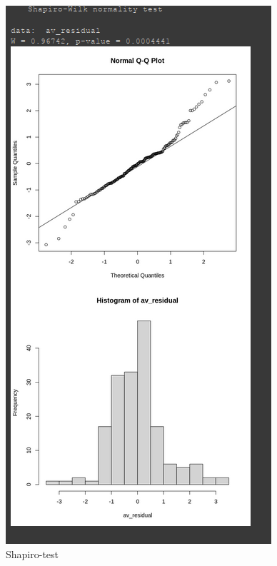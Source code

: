 \begin{itemize}
\begin{itemize}
    \begin{figure}[H]
        \centering
        \includegraphics[width=0.6\linewidth]{part01_figures/33.png}
        \caption{Shapiro-test}
        \label{fig:Shapiro-test}
    \end{figure}


\end{itemize}
\end{itemize}
